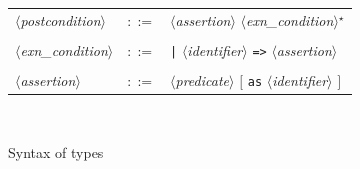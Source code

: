 \documentclass[a4paper,12pt]{report}
\makeatletter
\newcommand{\te}[1]{\texttt{#1}}
\newcommand{\nt}[1]{$\langle$\textsl{#1}$\rangle$}
\newcommand{\indexnt}[1]{\index{#1@\textsl{#1}, grammar entry}}
\newcommand{\etoile}{$^{\star}$}
\makeatother
\begin{document}
\begin{figure}[htbp]
\begin{center}
\begin{tabular}{lrl}
  \nt{postcondition}\indexnt{postcondition}
    & $::=$ & \nt{assertion} \nt{exn\_condition}\etoile \\
  \\[0.1em]

  \nt{exn\_condition} 
    & $::=$ & \te{|} \nt{identifier} \te{=>} \nt{assertion} \\
  \\[0.1em]

  \nt{assertion} 
    & $::=$ & \nt{predicate} $[$ \te{as} \nt{identifier} $]$ \\
\end{tabular}\\
\hrulefill
\caption{Syntax of types}
\label{fig:types}
\end{center}            
\end{figure}
\end{document}
